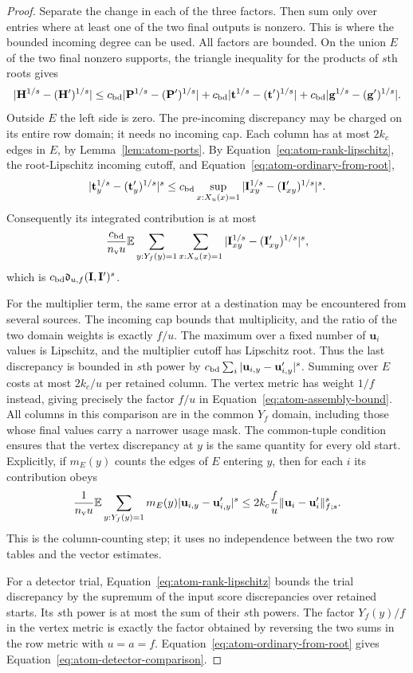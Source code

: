 \documentclass[11pt]{article}
\numberwithin{equation}{section}
\theoremstyle{definition}
\theoremstyle{remark}
\begin{document}
\begin{proof}
Separate the change in each of the three factors. Then sum only over entries where at least one of the two final outputs is nonzero. This is where the bounded incoming degree can be used. All factors are bounded. On the union $E$ of the two final nonzero
supports, the triangle inequality for the products of $s$th roots gives
\[
 |{\mathbf{H}}^{1/s}-({\mathbf{H}}')^{1/s}|
 \le {c_{\rm bd}}|{\mathbf{P}}^{1/s}-({\mathbf{P}}')^{1/s}|
     +{c_{\rm bd}}|{\mathbf{t}}^{1/s}-({\mathbf{t}}')^{1/s}|
     +{c_{\rm bd}}|{\mathbf{g}}^{1/s}-({\mathbf{g}}')^{1/s}|.
\]
Outside $E$ the left side is zero.  The pre-incoming discrepancy may be
charged on its entire row domain; it needs no incoming cap.  Each column
has at most $2{k}_c$ edges in $E$, by Lemma~\ref{lem:atom-ports}.
By Equation~\eqref{eq:atom-rank-lipschitz}, the root-Lipschitz incoming
cutoff, and Equation~\eqref{eq:atom-ordinary-from-root},
\[
 |{\mathbf{t}}_y^{1/s}-({\mathbf{t}}_y')^{1/s}|^s
 \le {c_{\rm bd}}\sup_{x:X_u(x)=1}
            |{\mathbf{I}}_{xy}^{1/s}-({\mathbf{I}}'_{xy})^{1/s}|^s.
\]
Consequently its integrated contribution is at most
\[
 \frac {c_{\rm bd}}{{n_{\rm v}}u}\mathbb E\sum_{y:Y_f(y)=1}
              \sum_{x:X_u(x)=1}
              |{\mathbf{I}}_{xy}^{1/s}-({\mathbf{I}}'_{xy})^{1/s}|^s,
\]
which is ${c_{\rm bd}}\mathfrak d_{u,f}({\mathbf{I}},{\mathbf{I}}')^s$.

For the multiplier term, the same error at a destination may be encountered from several sources. The incoming cap bounds that multiplicity, and the ratio of the two domain weights is exactly $f/u$. The maximum over a fixed number of ${\mathbf{u}}_i$ values is Lipschitz, and the
multiplier cutoff has Lipschitz root.  Thus the last discrepancy is
bounded in $s$th power by ${c_{\rm bd}}\sum_i|{\mathbf{u}}_{i,y}-{\mathbf{u}}'_{i,y}|^s$.
Summing over $E$ costs at most $2{k}_c/u$ per retained column.  The vertex
metric has weight $1/f$ instead, giving precisely the factor $f/u$ in
Equation~\eqref{eq:atom-assembly-bound}.  All columns in this comparison
are in the common $Y_f$ domain, including those whose final values carry
a narrower usage mask.  The common-tuple condition ensures that the
vertex discrepancy at $y$ is the same quantity for every old start.
Explicitly, if $m_E(y)$ counts the edges of $E$ entering $y$, then for
each $i$ its contribution obeys
\[
 \frac1{{n_{\rm v}}u}\mathbb E\sum_{y:Y_f(y)=1}
       m_E(y)|{\mathbf{u}}_{i,y}-{\mathbf{u}}'_{i,y}|^s
 \le 2{k}_c\frac fu\|{\mathbf{u}}_i-{\mathbf{u}}_i'\|_{f;s}^s.
\]
This is the column-counting step; it uses no independence between the
two row tables and the vector estimates.

For a detector trial, Equation~\eqref{eq:atom-rank-lipschitz} bounds the
trial discrepancy by the supremum of the input score discrepancies over
retained starts.  Its $s$th power is at most the sum of their $s$th powers.
The factor $Y_f(y)/f$ in the vertex metric is exactly the factor obtained
by reversing the two sums in the row metric with $u=a=f$.
Equation~\eqref{eq:atom-ordinary-from-root} gives
Equation~\eqref{eq:atom-detector-comparison}.
\end{proof}
\end{document}

